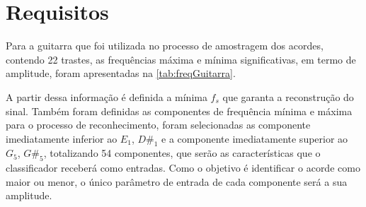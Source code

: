 
\localtableofcontents* 


\section{Requisitos}
%
Para a guitarra que foi utilizada no processo de amostragem dos acordes, contendo 22 trastes, as frequências máxima e mínima significativas, em termo de amplitude, foram apresentadas na \autoref{tab:freqGuitarra}.

A partir dessa informação é definida a mínima $f_s$ que garanta a reconstrução do sinal. Também foram definidas as componentes de frequência mínima e máxima para o processo de reconhecimento, foram selecionadas as componente imediatamente inferior ao $E_1$, $D\#_1$ e a componente imediatamente superior ao $G_5$, $G\#_5$, totalizando 54 componentes, que serão as características que o classificador receberá como entradas. Como o objetivo é identificar o acorde como maior ou menor, o único parâmetro de entrada de cada componente será a sua amplitude.
